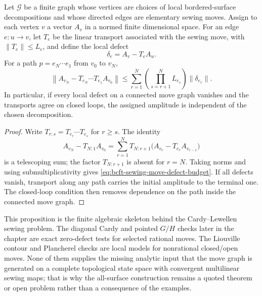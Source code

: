 \begin{proposition}
\label{prop:bcft-finite-move-defect-budget}
Let \(\mathcal G\) be a finite graph whose vertices are choices of local
bordered-surface decompositions and whose directed edges are elementary sewing
moves.  Assign to each vertex \(v\) a vector \(A_v\) in a normed finite
dimensional space.  For an edge \(e:u\to v\), let \(T_e\) be the linear
transport associated with the sewing move, with \(\|T_e\|\le L_e\), and define
the local defect
\[
  \delta_e=A_v-T_eA_u .
\]
For a path \(p=e_N\cdots e_1\) from \(v_0\) to \(v_N\),
\begin{equation}
  \left\|
  A_{v_N}-T_{e_N}\cdots T_{e_1}A_{v_0}
  \right\|
  \le
  \sum_{r=1}^{N}
  \left(\prod_{s=r+1}^{N}L_{e_s}\right)\|\delta_{e_r}\| .
  \label{eq:bcft-sewing-move-defect-budget}
\end{equation}
In particular, if every local defect on a connected move graph vanishes and the
transports agree on closed loops, the assigned amplitude is independent of the
chosen decomposition.
\end{proposition}

\begin{proof}
Write \(T_{r:s}=T_{e_r}\cdots T_{e_s}\) for \(r\ge s\).  The identity
\[
  A_{v_N}-T_{N:1}A_{v_0}
  =
  \sum_{r=1}^{N}
  T_{N:r+1}\bigl(A_{v_r}-T_{e_r}A_{v_{r-1}}\bigr)
\]
is a telescoping sum; the factor \(T_{N:r+1}\) is absent for \(r=N\).  Taking
norms and using submultiplicativity gives
\eqref{eq:bcft-sewing-move-defect-budget}.  If all defects vanish, transport
along any path carries the initial amplitude to the terminal one.  The
closed-loop condition then removes dependence on the path inside the connected
move graph.
\end{proof}

This proposition is the finite algebraic skeleton behind the Cardy--Lewellen
sewing problem.  The diagonal Cardy and pointed \(G/H\) checks later in the
chapter are exact zero-defect tests for selected rational moves.  The
Liouville contour and Plancherel checks are local models for nonrational
closed/open moves.  None of them supplies the missing analytic input that the
move graph is generated on a complete topological state space with convergent
multilinear sewing maps; that is why the all-surface construction remains a
quoted theorem or open problem rather than a consequence of the examples.

